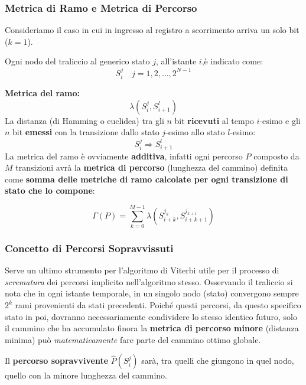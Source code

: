 \subsubsection{Metrica di Ramo e Metrica di Percorso}

Consideriamo il caso in cui in ingresso al registro a scorrimento arriva un solo bit ($k=1$).

Ogni nodo del traliccio al generico stato $j$, all'istante $i$,è indicato come:
\[S_i^j \quad j=1,2,\dots,2^{N-1}\]

\textbf{Metrica del ramo:}
\[\lambda(S_i^j,S_{i+1}^l)\]
La distanza (di Hamming o euclidea) tra gli $n$ bit \textbf{ricevuti} al tempo $i$-esimo e gli $n$ bit \textbf{emessi} con la transizione dallo stato $j$-esimo allo stato $l$-esimo:
\[S_i^j \Rightarrow S_{i+1}^l\]
La metrica del ramo è ovviamente \textbf{additiva}, infatti ogni percorso $P$ composto da $M$ transizioni avrà la \textbf{metrica di percorso} (lunghezza del cammino) definita come \textbf{somma delle metriche di ramo calcolate per ogni transizione di stato che lo compone}:

\[\Gamma(P)= \sum_{k=0}^{M-1}\lambda \left(S_{i+k}^{j_k}, S_{i+k+1}^{j_{k+1}}\right)\]

\subsubsection{Concetto di Percorsi Sopravvissuti}
Serve un ultimo strumento per l'algoritmo di Viterbi utile per il processo di \textit{scrematura} dei percorsi implicito nell'algoritmo stesso.
Osservando il traliccio si nota che in ogni istante temporale, in un singolo nodo (stato) convergono sempre $2^k$ rami provenienti da stati precedenti.
Poiché questi percorsi, da questo specifico stato in poi, dovranno necessariamente condividere lo stesso identico futuro, solo il cammino che ha accumulato finora la \textbf{metrica di percorso minore} (distanza minima) può \textit{matematicamente} fare parte del cammino ottimo globale.

Il \textbf{percorso sopravvivente} $\hat{P}(S_i^j)$ sarà, tra quelli che giungono in quel nodo, quello  con la minore lunghezza del cammino.

